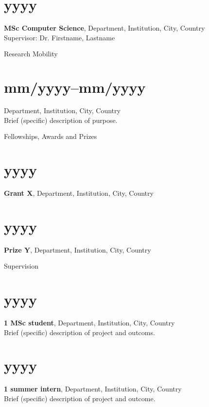 \documentclass[margin,line,10pt]{res}
\begin{document}
\begin{resume}
\section{\sc yyyy}{\bf MSc Computer Science}, Department, Institution, City, Country\\
Supervisor: Dr. Firstname, Lastname\\

\vspace*{-.2in}

{\sc Research Mobility}\\
\vspace*{-.35in}
\section{\sc mm/yyyy--mm/yyyy}Department, Institution, City, Country\\
Brief (specific) description of purpose.

\vspace*{-.2in}

{\sc Fellowships, Awards and Prizes}\\
\vspace*{-.35in}
\section{\sc yyyy}{\bf Grant X}, Department, Institution, City, Country\\
\vspace*{-.35in}
\section{\sc yyyy}{\bf Prize Y}, Department, Institution, City, Country\\

\vspace*{-.2in}

{\sc Supervision}\\
\vspace*{-.35in}
\section{\sc yyyy}{\bf 1 MSc student}, Department, Institution, City, Country\\
Brief (specific) description of project and outcoms.\\
\vspace*{-.35in}
\section{\sc yyyy}{\bf 1 summer intern}, Department, Institution, City, Country\\
Brief (specific) description of project and outcome.\\


\end{resume}
\end{document}
